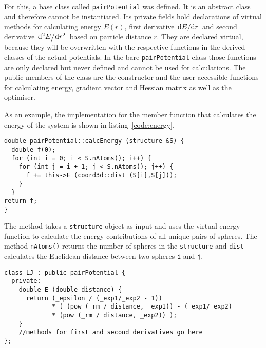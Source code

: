For this, a base class called \verb|pairPotential| was defined. It is an
abstract class and therefore cannot be instantiated. Its private fields hold
declarations of virtual methods for calculating energy $E(r)$, first derivative
$\dv*{E}{r}$ and second derivative $\dv*[2]{E}{r}$ based on particle distance
$r$. They are declared virtual, because they will be overwritten with the
respective functions in the derived classes of the actual potentials. In the
bare \verb|pairPotential| class those functions are only declared but never
defined and cannot be used for calculations. The public members of the class are
the constructor and the user-accessible functions for calculating energy,
gradient vector and Hessian matrix as well as the optimiser.

As an example, the \Cpp implementation for the member function that calculates
the energy of the system is shown in listing~\ref{code:energy}.
%
\begin{lstlisting}[caption={Implementation of the redundant part of the energy calculation.},label=code:energy,float=htb]
double pairPotential::calcEnergy (structure &S) {
  double f(0);
  for (int i = 0; i < S.nAtoms(); i++) {
    for (int j = i + 1; j < S.nAtoms(); j++) {
      f += this->E (coord3d::dist (S[i],S[j]));
    }
  }
return f;
}
\end{lstlisting}
%
The method takes a \verb|structure| object as input and uses the virtual energy
function to calculate the energy contributions of all unique pairs of spheres.
The method \texttt{nAtoms()} returns the number of spheres in the
\texttt{structure} and \texttt{dist} calculates the Euclidean distance between
two spheres \texttt{i} and \texttt{j}.

\begin{lstlisting}[caption={Implementation of the distance dependant energy for the Lennard-Jones potential.},label=code:LJenergy,float=htb]
class LJ : public pairPotential {
  private:
    double E (double distance) {
      return (_epsilon / (_exp1/_exp2 - 1)) 
             * ( (pow (_rm / distance, _exp1)) - (_exp1/_exp2) 
             * (pow (_rm / distance, _exp2)) );
    }
    //methods for first and second derivatives go here
};
\end{lstlisting}


